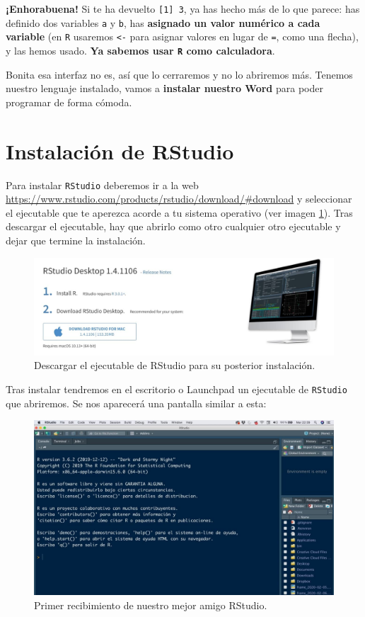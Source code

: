 \documentclass[11pt,]{book}
\begin{document}
\textbf{¡Enhorabuena!} Si te ha devuelto \texttt{{[}1{]}\ 3}, ya has hecho más de lo que parece: has definido dos variables \texttt{a} y \texttt{b}, has \textbf{asignado un valor numérico a cada variable} (en \texttt{R} usaremos \texttt{\textless{}-} para asignar valores en lugar de \texttt{=}, como una flecha), y las hemos usado. \textbf{Ya sabemos usar \texttt{R} como calculadora}.

Bonita esa interfaz no es, así que lo cerraremos y no lo abriremos más. Tenemos nuestro lenguaje instalado, vamos a \textbf{instalar nuestro Word} para poder programar de forma cómoda.

\hypertarget{instalacionRStudio}{%
\section{Instalación de RStudio}\label{instalacionRStudio}}

Para instalar \texttt{RStudio} deberemos ir a la web \url{https://www.rstudio.com/products/rstudio/download/\#download} y seleccionar el ejecutable que te aperezca acorde a tu sistema operativo (ver imagen \ref{fig:pantalla-rstudio}). Tras descargar el ejecutable, hay que abrirlo como otro cualquier otro ejecutable y dejar que termine la instalación.

\begin{figure}

{\centering \includegraphics[width=0.75\linewidth]{./img/pantalla_rstudio} 

}

\caption{Descargar el ejecutable de RStudio para su posterior instalación.}\label{fig:pantalla-rstudio}
\end{figure}

Tras instalar tendremos en el escritorio o Launchpad un ejecutable de \texttt{RStudio} que abriremos. Se nos aparecerá una pantalla similar a esta:

\begin{figure}

{\centering \includegraphics[width=0.75\linewidth]{./img/inicio_rstudio_1} 

}

\caption{Primer recibimiento de nuestro mejor amigo RStudio.}\label{fig:inicio-rstudio-1}
\end{figure}
\end{document}
